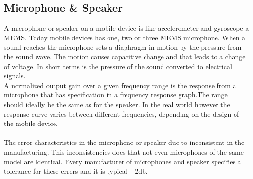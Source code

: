 \subsection{Microphone \& Speaker}\label{sec:char:micSpeak}
A microphone or speaker on a mobile device is like accelerometer and gyroscope a MEMS. Today mobile devices has one, two or three MEMS microphone. When a sound reaches the microphone sets a diaphragm in motion by the pressure from the sound wave. The motion causes capacitive change and that leads to a change of voltage. In short terms is the pressure of the sound converted to electrical signals. \cite[]{sensor:acoustic}\\
A normalized output gain over a given frequency range is the response from a microphone that has specification in a  frequency response graph.The range should ideally be the same as for the speaker. In the real world however the response curve varies between different frequencies, depending on the design of the mobile device.  \cite[]{sensor:micSpek}\\
\\ 
The error characteristics in the microphone or speaker due to inconsistent in the manufacturing. This inconsistencies does that not even microphones of the same model are identical. Every manufacturer of microphones and speaker specifies a tolerance for these errors and it is typical $\pm$2db.  \cite[]{sensor:micSpek}

